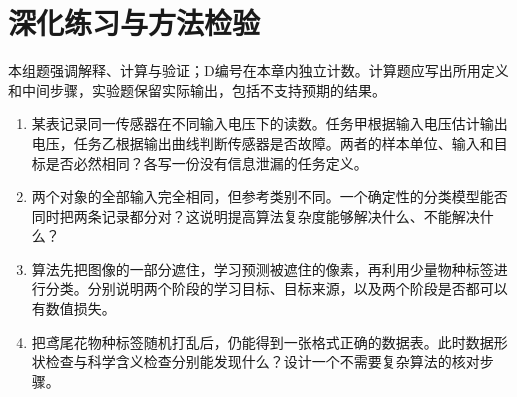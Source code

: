 \section*{深化练习与方法检验}
本组题强调解释、计算与验证；D编号在本章内独立计数。计算题应写出所用定义和中间步骤，实验题保留实际输出，包括不支持预期的结果。
\begin{enumerate}[label=D\arabic*.]
\item 某表记录同一传感器在不同输入电压下的读数。任务甲根据输入电压估计输出电压，任务乙根据输出曲线判断传感器是否故障。两者的样本单位、输入和目标是否必然相同？各写一份没有信息泄漏的任务定义。
\item 两个对象的全部输入完全相同，但参考类别不同。一个确定性的分类模型能否同时把两条记录都分对？这说明提高算法复杂度能够解决什么、不能解决什么？
\item 算法先把图像的一部分遮住，学习预测被遮住的像素，再利用少量物种标签进行分类。分别说明两个阶段的学习目标、目标来源，以及两个阶段是否都可以有数值损失。
\item 把鸢尾花物种标签随机打乱后，仍能得到一张格式正确的数据表。此时数据形状检查与科学含义检查分别能发现什么？设计一个不需要复杂算法的核对步骤。
\end{enumerate}
